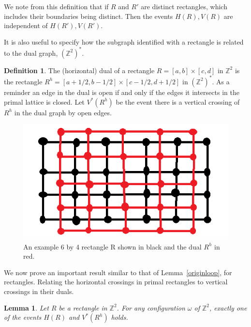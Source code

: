 \documentclass[a4paper,11pt]{article}
\newtheorem{lemma}[theorem]{Lemma}
\theoremstyle{definition}
\newtheorem{definition}[theorem]{Definition}
\newcommand{\ints}{\mathbb{Z}}
\newcommand{\ztwodual}{(\ints^2)^*}
\begin{document}
We note from this definition that if $R$ and $R'$ are distinct rectangles, which includes their boundaries being distinct. Then the events $H(R),V(R)$ are independent of $H(R'),V(R')$.

It is also useful to specify how the subgraph identified with a rectangle is related to the dual graph, $\ztwodual$.
\begin{definition}
	The (horizontal) dual of a rectangle $R = [a,b]\times[c,d]$ in $\ints^2$ is the rectangle $R^h = [a+1/2,b-1/2]\times[c-1/2,d+1/2]$ in $\ztwodual$. As a reminder an edge in the dual is open if and only if the edges it intersects in the primal lattice is closed.
	Let $V^*(R^h)$ be the event there is a vertical crossing of $R^h$ in the dual graph by open edges.
\end{definition}

\begin{figure}
	\centering
	\includegraphics[scale=0.6]{drawings/RectangleDual.png}
	\caption{An example 6 by 4 rectangle R shown in black and the dual $R^h$ in red.}
	\label{fig:rectangle}
\end{figure}

We now prove an important result similar to that of Lemma~\ref*{originloop}, for rectangles. Relating the horizontal crossings in primal rectangles to vertical crossings in their duals.

\begin{lemma}\label{rectangleProof}
	Let $R$ be a rectangle in $\ints^2$. For any configuration $\omega$ of $\ints^2$, exactly one of the events $H(R)$ and $V^*(R^h)$ holds.
\end{lemma}
\end{document}

